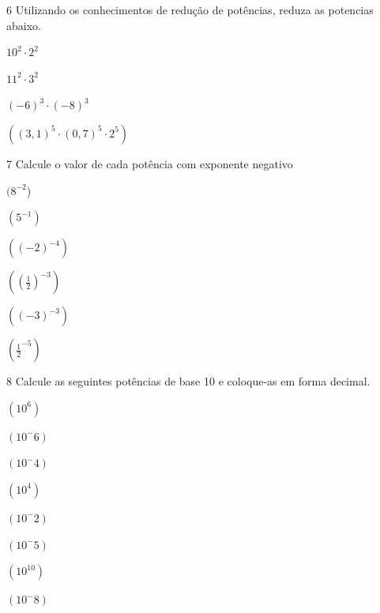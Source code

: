 \num{6} Utilizando os conhecimentos de redução de potências, reduza as
potencias abaixo.

\begin{escolha}[itemsep=0pt]
\item $10^2 \cdot 2^2$  
\item $11^2 \cdot 3^2$  
\item $(-6)^3 \cdot (-8)^3$  
\item $((3,1)^5 \cdot (0,7)^5 \cdot 2^5)$  
\end{escolha}





\num{7} Calcule o valor de cada potência com exponente negativo

\begin{escolha}[itemsep=0pt]
\item $(8^{-2}$) 
\item $(5^{-1})$ 
\item $((-2)^{-4}) $
\item $((\frac{1}{2})^{-3}) $
\item $((-3)^{-3}) $
\item $(\frac{1}{2}^{-5}) $
\end{escolha}


\num{8} Calcule as seguintes potências de base 10 e coloque-as em forma
decimal.

\begin{multicols}{2}
\begin{escolha}[itemsep=0pt]
\item $(10^6)$
\item $(10^-6)$
\item $(10^-4)$
\item $(10^4)$
\item $(10^-2)$
\item $(10 ^-5)$
\item $(10^10)$
\item $(10^-8)$
\end{escolha}
\end{multicols}

